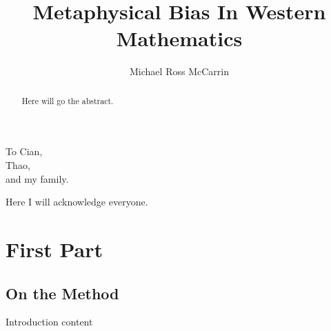 \documentclass[11pt]{ucscthesis}
\begin{document}

\title{Metaphysical Bias In Western Mathematics}
\author{Michael Ross McCarrin}
\deanlinethree{}

\begin{frontmatter}

\maketitle
\copyrightpage

\tableofcontents
\listoffigures
\listoftables

\begin{abstract}
Here will go the abstract.

\end{abstract}

\begin{dedication}
\null\vfil
{\large
\begin{center}
To Cian,\\\vspace{12pt}
Thao,\\\vspace{12pt}
and my family.
\end{center}}
\vfil\null
\end{dedication}


\begin{acknowledgements}
Here I will acknowledge everyone.

\end{acknowledgements}

\end{frontmatter}

\part{First Part}

\chapter{On the Method}
Introduction content
\end{document}
